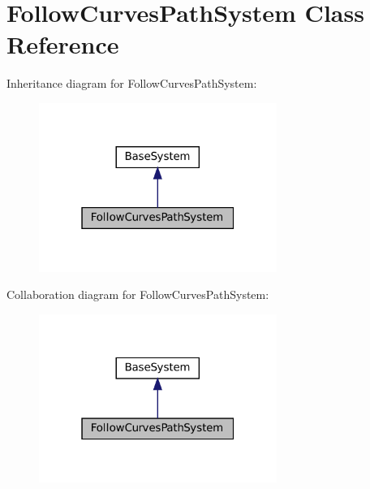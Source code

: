 \hypertarget{classFollowCurvesPathSystem}{}\section{Follow\+Curves\+Path\+System Class Reference}
\label{classFollowCurvesPathSystem}


Inheritance diagram for Follow\+Curves\+Path\+System\+:
\nopagebreak
\begin{figure}[H]
\begin{center}
\leavevmode
\includegraphics[width=220pt]{classFollowCurvesPathSystem__inherit__graph}
\end{center}
\end{figure}


Collaboration diagram for Follow\+Curves\+Path\+System\+:
\nopagebreak
\begin{figure}[H]
\begin{center}
\leavevmode
\includegraphics[width=220pt]{classFollowCurvesPathSystem__coll__graph}
\end{center}
\end{figure}
